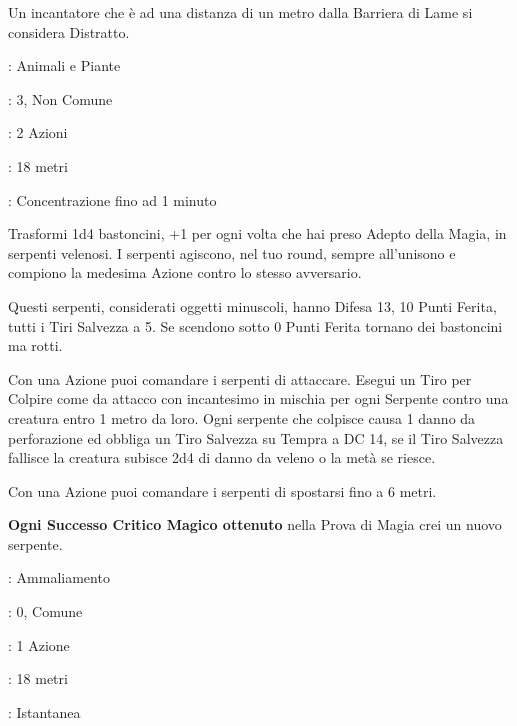 \begin{multicols}{2}
Un incantatore che è ad una distanza di un metro dalla Barriera di Lame si considera Distratto.

\noindent\colorbox{OBSSgold!10}{
\begin{minipage}{0.95\linewidth}
\begin{description}[noitemsep, topsep=0pt, parsep=0pt, partopsep=0pt, leftmargin=0cm, labelwidth=1.3cm]
	\item[\textbf{Lista}]: Animali e Piante
	\item[\textbf{Livello}]: 3, Non Comune
	\item[\textbf{Lancio}]: 2 Azioni
	\item[\textbf{Gittata}]: 18 metri
		\item[\textbf{Durata}]: Concentrazione fino ad 1 minuto
\end{description}
\end{minipage}}\smallskip

Trasformi 1d4 bastoncini, +1 per ogni volta che hai preso Adepto della Magia, in serpenti velenosi. I serpenti agiscono, nel tuo round, sempre all'unisono e compiono la medesima Azione contro lo stesso avversario.

Questi serpenti, considerati oggetti minuscoli, hanno Difesa 13, 10 Punti Ferita, tutti i Tiri Salvezza a 5. Se scendono sotto 0 Punti Ferita tornano dei bastoncini ma rotti.

Con una Azione puoi comandare i serpenti di attaccare. Esegui un Tiro per Colpire come da attacco con incantesimo in mischia per ogni Serpente contro una creatura entro 1 metro da loro. Ogni serpente che colpisce causa 1 danno da perforazione ed obbliga un Tiro Salvezza su Tempra a DC 14, se il Tiro Salvezza fallisce la creatura subisce 2d4 di danno da veleno o la metà se riesce.

Con una Azione puoi comandare i serpenti di spostarsi fino a 6 metri.

\textbf{Ogni Successo Critico Magico ottenuto} nella Prova di Magia crei un nuovo serpente.

\noindent\colorbox{OBSSgold!10}{
\begin{minipage}{0.95\linewidth}
\begin{description}[noitemsep, topsep=0pt, parsep=0pt, partopsep=0pt, leftmargin=0cm, labelwidth=1.3cm]
	\item[\textbf{Lista}]: Ammaliamento
	\item[\textbf{Livello}]: 0, Comune
	\item[\textbf{Lancio}]: 1 Azione
	\item[\textbf{Gittata}]: 18 metri
	\item[\textbf{Durata}]: Istantanea
\end{description}
\end{minipage}}\smallskip


\end{multicols}
